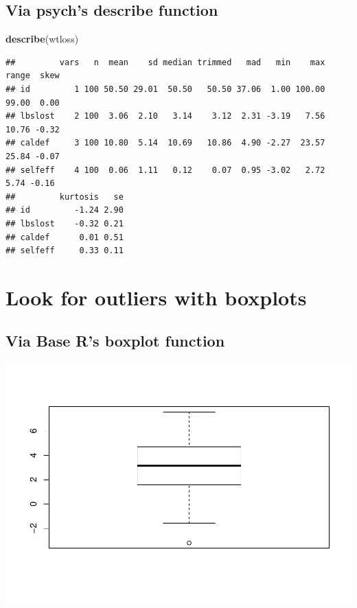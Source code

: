 \documentclass[]{article}
\newenvironment{Shaded}{\begin{snugshade}}{\end{snugshade}}
\newcommand{\KeywordTok}[1]{\textcolor[rgb]{0.13,0.29,0.53}{\textbf{#1}}}
\newcommand{\OperatorTok}[1]{\textcolor[rgb]{0.81,0.36,0.00}{\textbf{#1}}}
\newcommand{\NormalTok}[1]{#1}
\begin{document}
\subsection{Via psych's describe
function}\label{via-psychs-describe-function}

\begin{Shaded}
\begin{Highlighting}[]
\KeywordTok{describe}\NormalTok{(wtloss)}
\end{Highlighting}
\end{Shaded}

\begin{verbatim}
##         vars   n  mean    sd median trimmed   mad   min    max range  skew
## id         1 100 50.50 29.01  50.50   50.50 37.06  1.00 100.00 99.00  0.00
## lbslost    2 100  3.06  2.10   3.14    3.12  2.31 -3.19   7.56 10.76 -0.32
## caldef     3 100 10.80  5.14  10.69   10.86  4.90 -2.27  23.57 25.84 -0.07
## selfeff    4 100  0.06  1.11   0.12    0.07  0.95 -3.02   2.72  5.74 -0.16
##         kurtosis   se
## id         -1.24 2.90
## lbslost    -0.32 0.21
## caldef      0.01 0.51
## selfeff     0.33 0.11
\end{verbatim}

\section{Look for outliers with
boxplots}\label{look-for-outliers-with-boxplots}

\subsection{Via Base R's boxplot
function}\label{via-base-rs-boxplot-function}

\begin{Shaded}
\end{Shaded}

\includegraphics{wtloss_notebook_files/figure-latex/unnamed-chunk-6-1.pdf}
\end{document}
